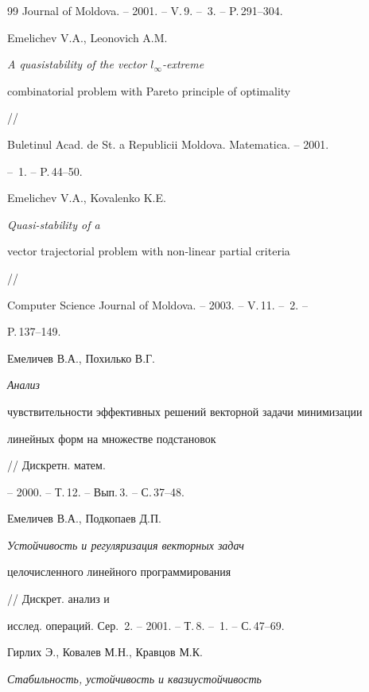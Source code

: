 \begin{thebibliography}{99}
Journal of Moldova. -- 2001. -- V.\,9. -- \No\,3. -- P.\,291--304.







Emelichev V.A., Leonovich A.M.


{\em A quasistability of the vector $l_\infty$-extreme


combinatorial problem with Pareto principle of optimality} //


Buletinul Acad. de St. a Republicii Moldova. Matematica. -- 2001.


-- \No\,1. -- P.\,44--50.







Emelichev V.A., Kovalenko K.E. {\em Quasi-stability of a


vector trajectorial problem with non-linear partial criteria} //


Computer Science Journal of Moldova. -- 2003. -- V.\,11. -- \No\,2. --


P.\,137--149.







Емеличев В.А., Похилько В.Г. {\em Анализ


чувствительности эффективных решений векторной задачи минимизации


линейных форм на множестве подстановок} // Дискретн. матем.


-- 2000. -- Т.\,12. -- Вып.\,3. -- С.\,37--48.







Емеличев В.А., Подкопаев Д.П.


{\em Устойчивость и регуляризация векторных задач


целочисленного линейного программирования} // Дискрет. анализ и


исслед. операций. Сер.~2. -- 2001. -- Т.\,8. -- \No\,1. -- С.\,47--69.







Гирлих Э., Ковалев М.Н., Кравцов М.К.


{\em Стабильность, устойчивость и квазиустойчивость


}
\end{thebibliography}
